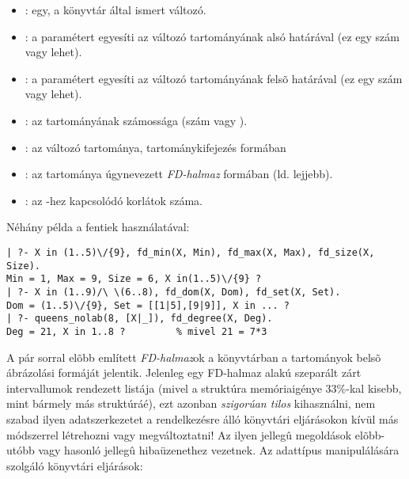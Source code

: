 \begin{itemize}
\item {}:  egy, a \clpfd könyvtár által ismert változó.
\item {}: a  paramétert egyesíti az 
változó tartományának alsó határával (ez egy szám vagy  lehet).
\item {}: a  paramétert egyesíti az 
változó tartományának felsõ határával (ez egy szám vagy  lehet).
\item {}:  az  tartományának számossága
(szám vagy ).
\item {}:  az  változó tartománya,
tartománykifejezés formában 
\item {}:  az  tartománya úgynevezett
\emph{FD-halmaz} formában (ld. lejjebb).
\item {}:  az -hez kapcsolódó korlátok
száma.
\end{itemize}

Néhány példa a fentiek használatával:

\begin{verbatim}
| ?- X in (1..5)\/{9}, fd_min(X, Min), fd_max(X, Max), fd_size(X, Size).
Min = 1, Max = 9, Size = 6, X in(1..5)\/{9} ? 
| ?- X in (1..9)/\ \(6..8), fd_dom(X, Dom), fd_set(X, Set).
Dom = (1..5)\/{9}, Set = [[1|5],[9|9]], X in ... ?
| ?- queens_nolab(8, [X|_]), fd_degree(X, Deg).
Deg = 21, X in 1..8 ?         % mivel 21 = 7*3
\end{verbatim}

A pár sorral elõbb említett \emph{FD-halmaz}ok a \clpfd könyvtárban a
tartományok belsõ ábrázolási formáját jelentik. Jelenleg egy FD-halmaz
 alakú szeparált zárt intervallumok rendezett listája (mivel
a  struktúra memóriaigénye 33\%-kal kisebb, mint bármely más
 struktúráé), ezt azonban \emph{szigorúan tilos} kihasználni, nem
szabad ilyen adatszerkezetet a rendelkezésre álló könyvtári eljárásokon
kívül más módszerrel létrehozni vagy megváltoztatni! Az ilyen jellegû
megoldások elõbb-utóbb  vagy hasonló jellegû
hibaüzenethez vezetnek.
\br
Az adattípus manipulálására szolgáló könyvtári eljárások:

